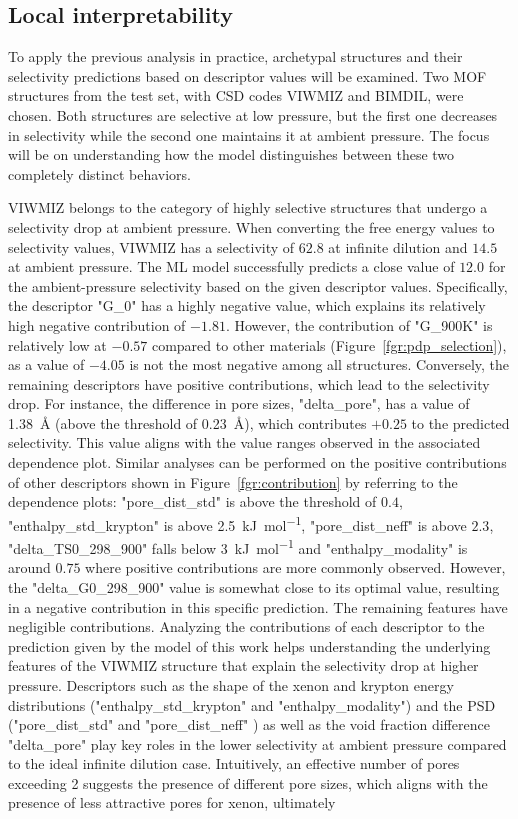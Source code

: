 \documentclass[main]{subfiles}
\begin{document}
\subsection{Local interpretability}

To apply the previous analysis in practice, archetypal structures and their selectivity predictions based on descriptor values will be examined. Two MOF structures from the test set, with CSD codes VIWMIZ and BIMDIL, were chosen. Both structures are selective at low pressure, but the first one decreases in selectivity while the second one maintains it at ambient pressure. The focus will be on understanding how the model distinguishes between these two completely distinct behaviors.

VIWMIZ belongs to the category of highly selective structures that undergo a selectivity drop at ambient pressure. When converting the free energy values to selectivity values, VIWMIZ has a selectivity of $62.8$ at infinite dilution and $14.5$ at ambient pressure. The ML model successfully predicts a close value of $12.0$ for the ambient-pressure selectivity based on the given descriptor values. Specifically, the descriptor "G\_0" has a highly negative value, which explains its relatively high negative contribution of $-1.81$. However, the contribution of "G\_900K" is relatively low at $-0.57$ compared to other materials (Figure~\ref{fgr:pdp_selection}), as a value of $-4.05$ is not the most negative among all structures. Conversely, the remaining descriptors have positive contributions, which lead to the selectivity drop. For instance, the difference in pore sizes, "delta\_pore", has a value of \SI{1.38}{\angstrom} (above the threshold of \SI{0.23}{\angstrom}), which contributes $+0.25$ to the predicted selectivity. This value aligns with the value ranges observed in the associated dependence plot. Similar analyses can be performed on the positive contributions of other descriptors shown in Figure~\ref{fgr:contribution} by referring to the dependence plots: "pore\_dist\_std" is above the threshold of $0.4$, "enthalpy\_std\_krypton" is above \SI{2.5}{\kilo\joule\per\mole}, "pore\_dist\_neff" is above $2.3$, "delta\_TS0\_298\_900" falls below \SI{3}{\kilo\joule\per\mole} and "enthalpy\_modality" is around $0.75$ where positive contributions are more commonly observed. However, the "delta\_G0\_298\_900" value is somewhat close to its optimal value, resulting in a negative contribution in this specific prediction. The remaining features have negligible contributions. Analyzing the contributions of each descriptor to the prediction given by the model of this work helps understanding the underlying features of the VIWMIZ structure that explain the selectivity drop at higher pressure. Descriptors such as the shape of the xenon and krypton energy distributions ("enthalpy\_std\_krypton" and "enthalpy\_modality") and the PSD ("pore\_dist\_std" and "pore\_dist\_neff" ) as well as the void fraction difference "delta\_pore" play key roles in the lower selectivity at ambient pressure compared to the ideal infinite dilution case. Intuitively, an effective number of pores exceeding 2 suggests the presence of different pore sizes, which aligns with the presence of less attractive pores for xenon, ultimately 
\end{document}
